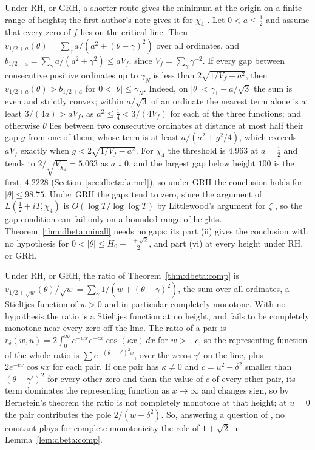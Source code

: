 \begin{remark}\label{rem:dbeta:nearest}
Under RH, or GRH, a shorter route gives the minimum at the origin on a finite range of heights; the first author's note gives it for $\chi_4$ \cite{P26beta}. Let $0<a\le\frac12$ and assume that every zero of $f$ lies on the critical line. Then $v_{1/2+a}(\theta)=\sum_\gamma a/(a^2+(\theta-\gamma)^2)$ over all ordinates, and $b_{1/2+a}=\sum_\gamma a/(a^2+\gamma^2)\le aV_f$, since $V_f=\sum_\gamma\gamma^{-2}$. If every gap between consecutive positive ordinates up to $\gamma_N$ is less than $2\sqrt{1/V_f-a^2}$, then $v_{1/2+a}(\theta)>b_{1/2+a}$ for $0<|\theta|\le\gamma_N$. Indeed, on $|\theta|<\gamma_1-a/\sqrt3$ the sum is even and strictly convex; within $a/\sqrt3$ of an ordinate the nearest term alone is at least $3/(4a)>aV_f$, as $a^2\le\frac14<3/(4V_f)$ for each of the three functions; and otherwise $\theta$ lies between two consecutive ordinates at distance at most half their gap $g$ from one of them, whose term is at least $a/(a^2+g^2/4)$, which exceeds $aV_f$ exactly when $g<2\sqrt{1/V_f-a^2}$. For $\chi_4$ the threshold is $4.963$ at $a=\frac12$ and tends to $2/\sqrt{V_{\chi_4}}=5.063$ as $a\downarrow0$, and the largest gap below height $100$ is the first, $4.2228$ (Section~\ref{sec:dbeta:kernel}), so under GRH the conclusion holds for $|\theta|\le98.75$. Under GRH the gaps tend to zero, since the argument of $L(\frac12+iT,\chi_4)$ is $O(\log T/\log\log T)$ by Littlewood's argument for $\zeta$ \cite[Theorem 14.13]{Titchmarsh}, so the gap condition can fail only on a bounded range of heights. Theorem~\ref{thm:dbeta:minall} needs no gaps: its part (ii) gives the conclusion with no hypothesis for $0<|\theta|\le H_0-\frac{1+\sqrt2}2$, and part (vi) at every height under RH, or GRH.
\end{remark}

\begin{remark}\label{rem:dbeta:stieltjes}
Under RH, or GRH, the ratio of Theorem~\ref{thm:dbeta:comp} is $v_{1/2+\sqrt w}(\theta)/\sqrt w=\sum_\gamma1/(w+(\theta-\gamma)^2)$, the sum over all ordinates, a Stieltjes function of $w>0$ and in particular completely monotone. With no hypothesis the ratio is a Stieltjes function at no height, and fails to be completely monotone near every zero off the line. The ratio of a pair is $r_\delta(w,u)=2\int_0^\infty e^{-wx}e^{-cx}\cos(\kappa x)\,dx$ for $w>-c$, so the representing function of the whole ratio is $\sum e^{-(\theta-\gamma')^2x}$, over the zeros $\gamma'$ on the line, plus $2e^{-cx}\cos\kappa x$ for each pair. If one pair has $\kappa\ne0$ and $c=u^2-\delta^2$ smaller than $(\theta-\gamma')^2$ for every other zero and than the value of $c$ of every other pair, its term dominates the representing function as $x\to\infty$ and changes sign, so by Bernstein's theorem the ratio is not completely monotone at that height; at $u=0$ the pair contributes the pole $2/(w-\delta^2)$. So, answering a question of \cite{P26beta}, no constant plays for complete monotonicity the role of $1+\sqrt2$ in Lemma~\ref{lem:dbeta:comp}.
\end{remark}

